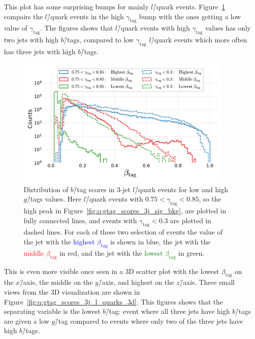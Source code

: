 This plot has some surprising bumps for mainly $l$\=/quark events. Figure~\ref{fig:q:gtag_scores_3j_l_quarks} compairs the $l$\=/quark events in the high $\gamma_\mathrm{tag}$ bump with the ones getting a low value of $\gamma_\mathrm{tag}$. The figures shows that $l$\=/quark events with high $\gamma_\mathrm{tag}$ values has only two jets with high $b$\=/tags, compared to low $\gamma_\mathrm{tag}$ $l$\=/quark events which more often has three jets with high $b$\=/tags. 

\begin{figure}[h!]
  \centerfloat
  \includegraphics[width=0.95\textwidth, trim=10 10 10 10, clip]{figures/quarks/leptons_high_g_tag_3j_0.75_gtag_0.85-down_sample=1.00-ML_vars=vertex-selection=b-ejet_min=4-n_iter_RS_lgb=99-n_iter_RS_xgb=9-cdot_cut=0.90-version=19.pdf}
  \caption[Distribution of $b$\=/Tag Scores in 3-Jet $l$\=/Quark Events for Low and High $g$\=/Tag Values]
          {Distribution of $b$\=/tag scores in 3-jet $l$\=/quark events for low and high $g$\=/tags values. Here $l$\=/quark events with $0.75 < \gamma_\mathrm{tag} <  0.85$, so the high peak in Figure~\ref{fig:q:gtag_scores_3j_sig_bkg}, are plotted in fully connected lines, and events with $\gamma_\mathrm{tag} <  0.3$ are plotted in dashed lines. For each of these two selection of events the value of the jet with the \textcolor{blue}{highest $\beta_\mathrm{tag}$} is shown in blue, the jet with the \textcolor{red}{middle $\beta_\mathrm{tag}$} in red, and the jet with the \textcolor{green}{lowest $\beta_\mathrm{tag}$} in green.} 
  \label{fig:q:gtag_scores_3j_l_quarks}
\end{figure}

This is even more visible once seen in a 3D scatter plot with the lowest $\beta_\mathrm{tag}$ on the $x$\=/axis, the middle on the $y$\=/axis, and highest on the $z$\=/axis. Three small views from the 3D visualization are shown in Figure~\ref{fig:q:gtag_scores_3j_l_quarks_3d}. This figures shows that the separating variable is the lowest $b$\=/tag: event where all three jets have high $b$\=/tags are given a low $g$\=/tag compared to events where only two of the three jets have high $b$\=/tags.

